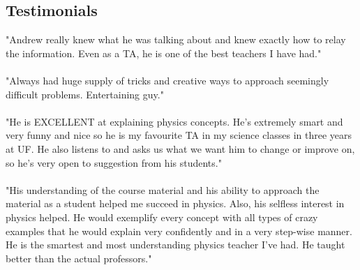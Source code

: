 \begin{resume}
    \section{\mysidestyle Testimonials}
              "Andrew really knew what he was talking about and knew exactly how to relay the information. Even as a TA, he is one of the best teachers I have had."
             \\ \\ "Always had huge supply of tricks and creative ways to approach seemingly difficult problems. Entertaining guy."
             \\ \\ "He is EXCELLENT at explaining physics concepts. He's extremely smart and very funny and nice so he is my favourite TA in my science classes in three years at UF. He also listens to and asks us what we want him to change or improve on, so he's very open to suggestion from his students."
             \\ \\ "His understanding of the course material and his ability to approach the material as a student helped me succeed in physics. Also, his selfless interest in physics helped. He would exemplify every concept with all types of crazy examples that he would explain very confidently and in a very step-wise manner. He is the smartest and most understanding physics teacher I've had. He taught better than the actual professors."
\end{resume}


